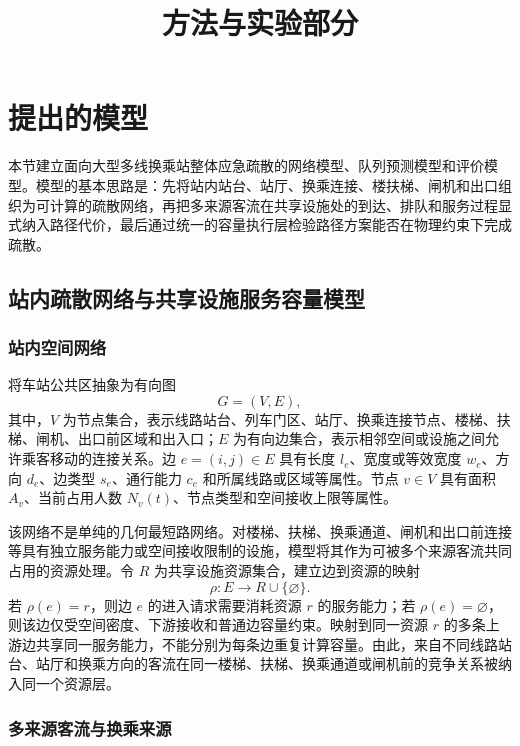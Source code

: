 \documentclass[UTF8,a4paper,12pt]{ctexart}
\title{方法与实验部分}
\author{}
\date{}
\begin{document}
\maketitle

\setcounter{section}{2}

\section{提出的模型}

本节建立面向大型多线换乘站整体应急疏散的网络模型、队列预测模型和评价模型。模型的基本思路是：先将站内站台、站厅、换乘连接、楼扶梯、闸机和出口组织为可计算的疏散网络，再把多来源客流在共享设施处的到达、排队和服务过程显式纳入路径代价，最后通过统一的容量执行层检验路径方案能否在物理约束下完成疏散。

\subsection{站内疏散网络与共享设施服务容量模型}

\subsubsection{站内空间网络}

将车站公共区抽象为有向图
\[
G=(V,E),
\]
其中，\(V\) 为节点集合，表示线路站台、列车门区、站厅、换乘连接节点、楼梯、扶梯、闸机、出口前区域和出入口；\(E\) 为有向边集合，表示相邻空间或设施之间允许乘客移动的连接关系。边 \(e=(i,j)\in E\) 具有长度 \(l_e\)、宽度或等效宽度 \(w_e\)、方向 \(d_e\)、边类型 \(s_e\)、通行能力 \(c_e\) 和所属线路或区域等属性。节点 \(v\in V\) 具有面积 \(A_v\)、当前占用人数 \(N_v(t)\)、节点类型和空间接收上限等属性。

该网络不是单纯的几何最短路网络。对楼梯、扶梯、换乘通道、闸机和出口前连接等具有独立服务能力或空间接收限制的设施，模型将其作为可被多个来源客流共同占用的资源处理。令 \(R\) 为共享设施资源集合，建立边到资源的映射
\[
\rho:E\rightarrow R\cup\{\varnothing\}.
\]
若 \(\rho(e)=r\)，则边 \(e\) 的进入请求需要消耗资源 \(r\) 的服务能力；若 \(\rho(e)=\varnothing\)，则该边仅受空间密度、下游接收和普通边容量约束。映射到同一资源 \(r\) 的多条上游边共享同一服务能力，不能分别为每条边重复计算容量。由此，来自不同线路站台、站厅和换乘方向的客流在同一楼梯、扶梯、换乘通道或闸机前的竞争关系被纳入同一个资源层。

\subsubsection{多来源客流与换乘来源}
\end{document}
